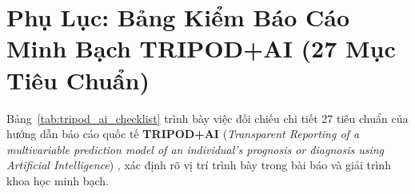 \section{Phụ Lục: Bảng Kiểm Báo Cáo Minh Bạch TRIPOD+AI (27 Mục Tiêu Chuẩn)}
\label{sec:appendix_tripod_ai}

Bảng~\ref{tab:tripod_ai_checklist} trình bày việc đối chiếu chi tiết 27 tiêu chuẩn của hướng dẫn báo cáo quốc tế \textbf{TRIPOD+AI} (\textit{Transparent Reporting of a multivariable prediction model of an individual's prognosis or diagnosis using Artificial Intelligence}) \cite{collins2024tripod}, xác định rõ vị trí trình bày trong bài báo và giải trình khoa học minh bạch.

